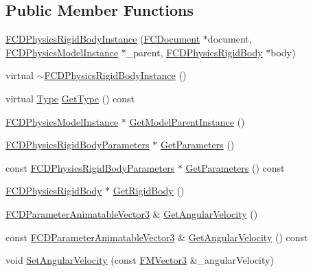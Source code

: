 \subsection*{Public Member Functions}
\begin{DoxyCompactItemize}
\item 
\hyperlink{classFCDPhysicsRigidBodyInstance_ab481a5dc9a029338ad4390c57e2220c3}{FCDPhysicsRigidBodyInstance} (\hyperlink{classFCDocument}{FCDocument} $\ast$document, \hyperlink{classFCDPhysicsModelInstance}{FCDPhysicsModelInstance} $\ast$\_\-parent, \hyperlink{classFCDPhysicsRigidBody}{FCDPhysicsRigidBody} $\ast$body)
\item 
virtual \hyperlink{classFCDPhysicsRigidBodyInstance_ac105439aae23bff00a972bcf0303d62d}{$\sim$FCDPhysicsRigidBodyInstance} ()
\item 
virtual \hyperlink{classFCDEntityInstance_a82e95eec7d9242bbedb336b0d35b59d3}{Type} \hyperlink{classFCDPhysicsRigidBodyInstance_a8cc8936e74d129b15b8f7a7ea7e0f7d9}{GetType} () const 
\item 
\hyperlink{classFCDPhysicsModelInstance}{FCDPhysicsModelInstance} $\ast$ \hyperlink{classFCDPhysicsRigidBodyInstance_aaca1a0550e67488fa603a4d20de8e3ec}{GetModelParentInstance} ()
\item 
\hyperlink{classFCDPhysicsRigidBodyParameters}{FCDPhysicsRigidBodyParameters} $\ast$ \hyperlink{classFCDPhysicsRigidBodyInstance_a4e67bd1397ce847e49bc8cf11392e1d9}{GetParameters} ()
\item 
const \hyperlink{classFCDPhysicsRigidBodyParameters}{FCDPhysicsRigidBodyParameters} $\ast$ \hyperlink{classFCDPhysicsRigidBodyInstance_a0c95969518a2301993b7e2c344dd7aeb}{GetParameters} () const 
\item 
\hyperlink{classFCDPhysicsRigidBody}{FCDPhysicsRigidBody} $\ast$ \hyperlink{classFCDPhysicsRigidBodyInstance_ae6d4bf00a273a4c8fee80eb14c61f6f4}{GetRigidBody} ()
\item 
\hyperlink{classFCDParameterAnimatableT}{FCDParameterAnimatableVector3} \& \hyperlink{classFCDPhysicsRigidBodyInstance_ac83194c3601005a5432bdc69e7ea1d15}{GetAngularVelocity} ()
\item 
const \hyperlink{classFCDParameterAnimatableT}{FCDParameterAnimatableVector3} \& \hyperlink{classFCDPhysicsRigidBodyInstance_aeb813281e23a52c193cfdd12b938832d}{GetAngularVelocity} () const 
\item 
void \hyperlink{classFCDPhysicsRigidBodyInstance_a79a09682c7f68ea6d9c852970a79f43c}{SetAngularVelocity} (const \hyperlink{classFMVector3}{FMVector3} \&\_\-angularVelocity)

\end{DoxyCompactItemize}
